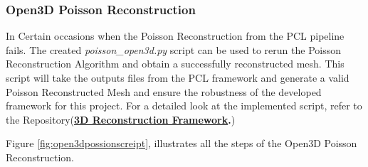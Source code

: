 \documentclass[12pt]{report}
\begin{document}
\subsubsection*{Open3D Poisson Reconstruction}
In Certain occasions when the Poisson Reconstruction from the PCL pipeline fails. The created \textit{poisson\_open3d.py} script can be used to rerun the Poisson Reconstruction Algorithm and obtain a successfully reconstructed mesh.
This script will take the outputs files from the PCL framework and generate a valid Poisson Reconstructed Mesh and ensure the robustness of the developed framework for this project.
For a detailed look at the implemented script, refer to the Repository(\textbf{\href{https://github.com/esteban-andrade/3D-Reconstructrion-Scanner} {3D Reconstruction Framework}.})

Figure \ref{fig:open3dpossionscreipt}, illustrates all the steps of the Open3D Poisson Reconstruction.
\end{document}
